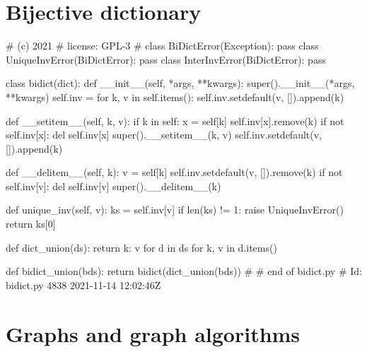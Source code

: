 \section{Bijective dictionary}

\begin{dispPy}
#    (c) 2021 
#    license:          GPL-3
#
class BiDictError(Exception): pass
class UniqueInvError(BiDictError): pass
class InterInvError(BiDictError): pass

class bidict(dict):
    def __init__(self, *args, **kwargs):
        super().__init__(*args, **kwargs)
        self.inv = {}
        for k, v in self.items():
            self.inv.setdefault(v, []).append(k)

    def __setitem__(self, k, v):
        if k in self:
            x = self[k]
            self.inv[x].remove(k)
            if not self.inv[x]:
                del self.inv[x]
        super().__setitem__(k, v)
        self.inv.setdefault(v, []).append(k)

    def __delitem__(self, k):
        v = self[k]
        self.inv.setdefault(v, []).remove(k)
        if not self.inv[v]:
            del self.inv[v]
        super().__delitem__(k)

    def unique_inv(self, v):
        ks = self.inv[v]
        if len(ks) != 1:
            raise UniqueInvError()
        return ks[0]


def dict_union(ds):
    return {k: v for d in ds for k, v in d.items()}

def bidict_union(bds):
    return bidict(dict_union(bds))
#
# end of bidict.py
# Id: bidict.py 4838 2021-11-14 12:02:46Z 
\end{dispPy}

\section{Graphs and graph algorithms}

